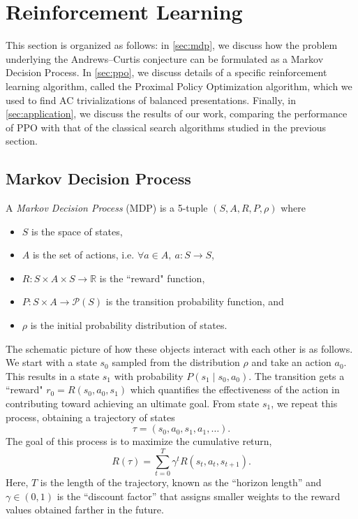 
\section{Reinforcement Learning}\label{sec:rl}


This section is organized as follows: in \autoref{sec:mdp}, we discuss how the problem underlying the Andrews--Curtis conjecture can be formulated as a Markov Decision Process.
In \autoref{sec:ppo}, we discuss details of a specific reinforcement learning algorithm, called the Proximal Policy Optimization algorithm, which we used to find AC trivializations of balanced presentations.
Finally, in \autoref{sec:application}, we discuss the results of our work, comparing the performance of PPO with that of the classical search algorithms studied in the previous section.

\subsection{Markov Decision Process} \label{sec:mdp}

A \textit{Markov Decision Process} (MDP) is a 5-tuple $(S, A, R, P, \rho)$ where
\begin{itemize}
	\item $S$ is the space of states,
	\item $A$ is the set of actions, i.e. $\forall a \in A, \ a \colon S \to S$,
	\item $R \colon S \times A \times S \to \mathbb{R}$ is the ``reward" function,
	\item $P \colon S \times A \to \mathcal{P}(S)$ is the transition probability function, and
	\item $\rho$ is the initial probability distribution of states.
\end{itemize}

The schematic picture of how these objects interact with each other is as follows. We start with a state $s_0$ sampled from the distribution $\rho$ and take an action $a_0$. This results in a state $s_1$ with probability $P(s_1 \mid s_0, a_0) $. The transition gets a ``reward" $r_0 = R(s_0, a_0, s_1)$ which quantifies the effectiveness of the action in contributing toward achieving an ultimate goal. From state $s_1$, we repeat this process, obtaining a trajectory of states
\[
\tau = \left( s_0, a_0, s_1, a_1, \dots \right).
\]
The goal of this process is to maximize the cumulative return,
\[
R(\tau) = \sum\limits_{t=0}^{T} \gamma^t R(s_t, a_t, s_{t+1}).
\]
Here, $T$ is the length of the trajectory, known as the ``horizon length'' and $\gamma \in \left(0, 1 \right)$ is the ``discount factor'' that assigns smaller weights to the reward values obtained farther in the future.

